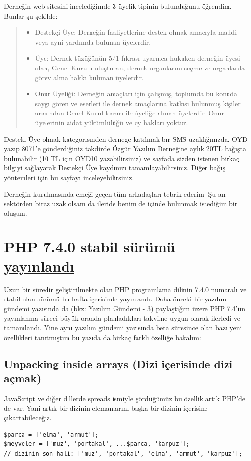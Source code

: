\documentclass[11pt]{article}
\begin{document}
Derneğin web sitesini incelediğimde 3 üyelik tipinin bulunduğunu öğrendim.
Bunlar şu şekilde:

\begin{quote}
\begin{itemize}
\item Destekçi Üye: Derneğin faaliyetlerine destek olmak amacıyla maddi veya ayni
yardımda bulunan üyelerdir.
\item Üye: Dernek tüzüğünün 5⁄1 fıkrası uyarınca hukuken derneğin üyesi olan,
Genel Kurulu oluşturan, dernek organlarını seçme ve organlarda görev alma
hakkı bulunan üyelerdir.
\item Onur Üyeliği: Derneğin amaçları için çalışmış, toplumda bu konuda saygı
gören ve eserleri ile dernek amaçlarına katkısı bulunmuş kişiler arasından
Genel Kurul kararı ile üyeliğe alınan üyelerdir. Onur üyelerinin aidat
yükümlülüğü ve oy hakları yoktur.
\end{itemize}
\end{quote}

Desteki Üye olmak kategorisinden derneğe katılmak bir SMS uzaklığınızda. OYD
yazıp 8071'e gönderdiğiniz takdirde Özgür Yazılım Derneğine aylık 20TL bağışta
bulunabilir (10 TL için OYD10 yazabilirsiniz) ve sayfada sizden istenen birkaç
bilgiyi sağlayarak Destekçi Üye kaydınızı tamamlayabilirsiniz. Diğer bağış
yöntemleri için \href{https://bagis.oyd.org.tr/}{bu sayfayı} inceleyebilirsiniz.

Derneğin kurulmasında emeği geçen tüm arkadaşları tebrik ederim. Şu an
sektörden biraz uzak olsam da ileride benim de içinde bulunmak istediğim bir
oluşum.
\section{PHP 7.4.0 stabil sürümü \href{https://www.php.net/archive/2019.php\#2019-11-28-1}{yayınlandı}}
\label{sec:org688b94c}
Uzun bir süredir geliştirilmekte olan PHP programlama dilinin 7.4.0 numaralı ve
stabil olan sürümü bu hafta içerisinde yayınlandı. Daha önceki bir yazılım
gündemi yazısında da (bkz: \href{../03/yazilim-gundemi-03.pdf}{Yazılım Gündemi - 3}) paylaştığım üzere PHP 7.4'ün
yayınlanma süreci büyük oranda planladıkları takvime uygun olarak ilerledi ve
tamamlandı. Yine aynı yazılım gündemi yazısında beta süresince olan bazı yeni
özellikleri tanıtmıştım bu yazıda da birkaç farklı özelliğe bakalım:
\subsection{Unpacking inside arrays (Dizi içerisinde dizi açmak)}
\label{sec:org10429f2}
JavaScript ve diğer dillerde spreads ismiyle gördüğümüz bu özellik artık
PHP'de de var. Yani artık bir dizinin elemanlarını başka bir dizinin içerisine
çıkartabileceğiz.
\begin{verbatim}
$parca = ['elma', 'armut'];
$meyveler = ['muz', 'portakal', ...$parca, 'karpuz'];
// dizinin son hali: ['muz', 'portakal', 'elma', 'armut', 'karpuz'];
\end{verbatim}
\end{document}
